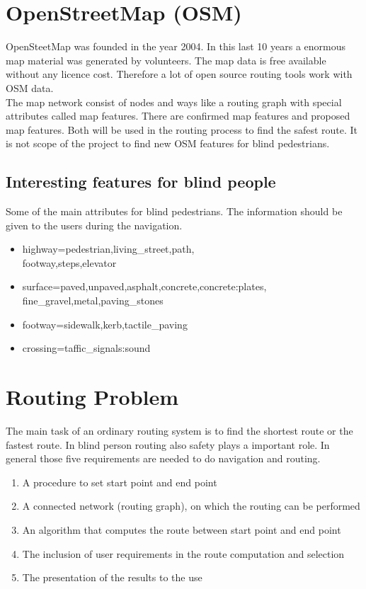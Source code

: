 \documentclass{sig-alternate}
\begin{document}
\section{OpenStreetMap (OSM)}
OpenSteetMap was founded in the year 2004. In this last 10 years a enormous map material was generated by volunteers. The map data is free available without any licence cost. Therefore a lot of open source routing tools work with OSM data. \\
The map network consist of nodes and ways like a routing graph with special attributes called map features. There are confirmed map features and proposed map features.  Both will be used in the routing process to find the safest route. It is not scope of the project to find new OSM features for blind pedestrians.   

\subsection{Interesting features for blind people}
Some of the main attributes for blind pedestrians. The information should be given to the users during the navigation.
\begin{itemize}
  \item highway=pedestrian,living\_street,path, \\ footway,steps,elevator
  \item surface=paved,unpaved,asphalt,concrete,concrete:plates, \\ fine\_gravel,metal,paving\_stones
  \item footway=sidewalk,kerb,tactile\_paving
  \item crossing=taffic\_signals:sound  
\end{itemize}

\section{Routing Problem}
The main task of an ordinary routing system is to find the shortest route or the fastest route. In blind person routing also safety plays a important  role. In general those five requirements\cite{weyrer} are needed to do navigation and routing.
\begin{enumerate}
  \item A procedure to set start point and end point
  \item A connected network (routing graph), on which the routing can be performed
  \item An algorithm that computes the route between start point and end point
  \item The inclusion of user requirements in the route computation and selection
  \item The presentation of the results to the use
\end{enumerate}
\end{document}
